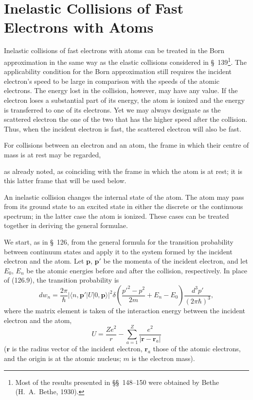 \section{Inelastic Collisions of Fast Electrons with Atoms}

Inelastic collisions of fast electrons with atoms can be treated in the Born
approximation in the same way as the elastic collisions considered in
\S~139\footnote{Most of the results presented in \S\S~148--150 were obtained
by Bethe (H.~A.~Bethe, 1930).}. The applicability condition for the Born
approximation still requires the incident electron's speed to be large in
comparison with the speeds of the atomic electrons. The energy lost in the
collision, however, may have any value. If the electron loses a substantial
part of its energy, the atom is ionized and the energy is transferred to one
of its electrons. Yet we may always designate as the scattered electron the
one of the two that has the higher speed after the collision. Thus, when the
incident electron is fast, the scattered electron will also be fast.

For collisions between an electron and an atom, the frame in which their
centre of mass is at rest may be regarded,

as already noted, as coinciding with the frame in which the atom is at rest;
it is this latter frame that will be used below.

An inelastic collision changes the internal state of the atom. The atom may
pass from its ground state to an excited state in either the discrete or the
continuous spectrum; in the latter case the atom is ionized. These cases can
be treated together in deriving the general formulae.

We start, as in \S~126, from the general formula for the transition
probability between continuum states and apply it to the system formed by the
incident electron and the atom. Let $\mathbf p$, $\mathbf p'$ be the momenta
of the incident electron, and let $E_0$, $E_n$ be the atomic energies before
and after the collision, respectively. In place of (126.9), the transition
probability is
\begin{equation}
 dw_n=\frac{2\pi}{\hbar}|\langle n,\mathbf p'|U|0,\mathbf p\rangle|^2
 \delta\!\left(\frac{p'^2-p^2}{2m}+E_n-E_0\right)
 \frac{d^3p'}{(2\pi\hbar)^3},
 \tag{148.1}
\end{equation}
where the matrix element is taken of the interaction energy between the
incident electron and the atom,
\[
 U=\frac{Ze^2}{r}-\sum_{a=1}^{Z}\frac{e^2}{|\mathbf r-\mathbf r_a|}
\]
($\mathbf r$ is the radius vector of the incident electron, $\mathbf r_a$
those of the atomic electrons, and the origin is at the atomic nucleus; $m$
is the electron mass).

